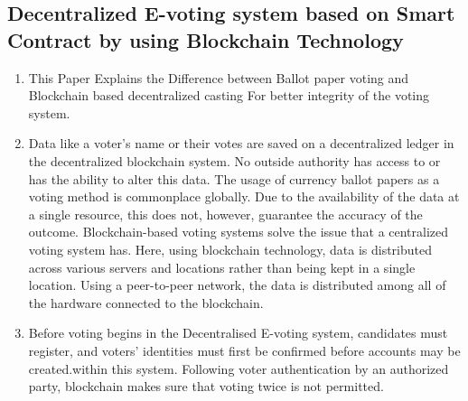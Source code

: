 \documentclass[10pt,final,journal,a4paper,oneside,twocolumn]{IEEEtran}
\begin{document}
		\subsection{Decentralized E-voting system based on Smart Contract by using Blockchain Technology \cite{al2020decentralized}}
			\begin{enumerate}
				\item This Paper Explains the Difference between Ballot paper voting and Blockchain based decentralized casting For better integrity of the voting system.
				\item Data like a voter's name or their votes are saved on a decentralized ledger in the decentralized blockchain system. No outside authority has access to or has the ability to alter this data. The usage of currency ballot papers as a voting method is commonplace globally. Due to the availability of the data at a single resource, this does not, however, guarantee the accuracy of the outcome. Blockchain-based voting systems solve the issue that a centralized voting system has. Here, using blockchain technology, data is distributed across various servers and locations rather than being kept in a single location. Using a peer-to-peer network, the data is distributed among all of the hardware connected to the blockchain.
				\item Before voting begins in the Decentralised E-voting system, candidates must register, and voters' identities must first be confirmed before accounts may be created.within this system. Following voter authentication by an authorized party, blockchain makes sure that voting twice is not permitted.
			\end{enumerate}
\end{document}
